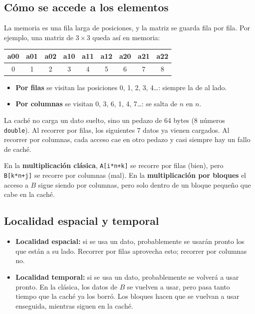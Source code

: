 \documentclass[11pt]{article}
\begin{document}
\subsection{Cómo se accede a los elementos}

La memoria es una fila larga de posiciones, y la matriz se guarda fila por
fila. Por ejemplo, una matriz de $3 \times 3$ queda así en memoria:

\begin{center}
\ttfamily
\begin{tabular}{|c|c|c|c|c|c|c|c|c|}
\hline
a00 & a01 & a02 & a10 & a11 & a12 & a20 & a21 & a22 \\
\hline
0 & 1 & 2 & 3 & 4 & 5 & 6 & 7 & 8 \\
\hline
\end{tabular}
\end{center}

\begin{itemize}
\item \textbf{Por filas} se visitan las posiciones 0, 1, 2, 3, 4\dots{}: siempre
      la de al lado.
\item \textbf{Por columnas} se visitan 0, 3, 6, 1, 4, 7\dots{}: se salta de $n$
      en $n$.
\end{itemize}

La caché no carga un dato suelto, sino un pedazo de 64 bytes (8 números
\texttt{double}). Al recorrer por filas, los siguientes 7 datos ya vienen
cargados. Al recorrer por columnas, cada acceso cae en otro pedazo y casi
siempre hay un fallo de caché.

En la \textbf{multiplicación clásica}, \texttt{A[i*n+k]} se recorre por filas
(bien), pero \texttt{B[k*n+j]} se recorre por columnas (mal). En la
\textbf{multiplicación por bloques} el acceso a $B$ sigue siendo por columnas,
pero solo dentro de un bloque pequeño que cabe en la caché.

\subsection{Localidad espacial y temporal}

\begin{itemize}
\item \textbf{Localidad espacial:} si se usa un dato, probablemente se usarán
      pronto los que están a su lado. Recorrer por filas aprovecha esto;
      recorrer por columnas no.
\item \textbf{Localidad temporal:} si se usa un dato, probablemente se volverá
      a usar pronto. En la clásica, los datos de $B$ se vuelven a usar, pero
      pasa tanto tiempo que la caché ya los borró. Los bloques hacen que se
      vuelvan a usar enseguida, mientras siguen en la caché.
\end{itemize}
\end{document}
